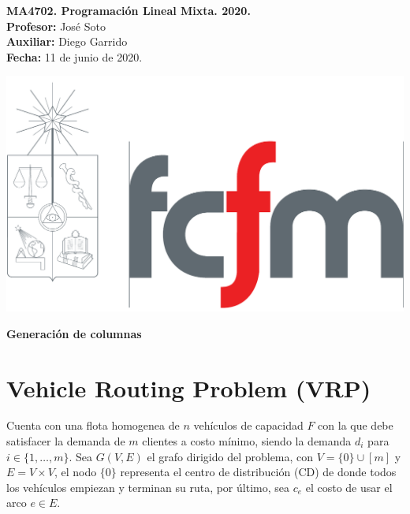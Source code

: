 \documentclass[10pt]{article}
\theoremstyle{plain}
\theoremstyle{definition}
\newcommand{\sca}{Diego Garrido}
\newcommand{\fecha}{11 de junio  de 2020}
\begin{document}
\vspace*{-1.2 cm}
\begin{minipage}{0.6\textwidth}
\begin{flushleft}
\hspace*{-0.5cm}\textbf{MA4702. Programación Lineal Mixta. 2020.}\\
\hspace*{-0.5cm}\textbf{Profesor:} José Soto\\
\hspace*{-0.5cm}\textbf{Auxiliar:} \sca\\
\hspace*{-0.5cm}\textbf{Fecha:} \fecha.
\end{flushleft}
\end{minipage}
\begin{minipage}{0.36\textwidth}
\begin{flushright}
\includegraphics[scale=0.15]{fcfm}
\end{flushright}
\end{minipage}
\bigskip

\begin{center}
\LARGE\textbf{Generación de columnas}
\end{center}


\section{Vehicle Routing Problem (VRP)}

Cuenta con una flota homogenea de $n$ vehículos de capacidad $F$ con la que debe satisfacer la demanda de $m$ clientes a costo mínimo, siendo la demanda $d_{i}$ para $i\in\{1,\ldots, m\}$. Sea $G(V,E)$ el grafo dirigido del problema, con $V=\{0\}\cup[m]$ y $E=V\times V$, el nodo $\{0\}$ representa el centro de distribución (CD) de donde todos los vehículos empiezan y terminan su ruta, por último, sea $c_{e}$ el costo de usar el arco $e\in E$.  
\end{document}
